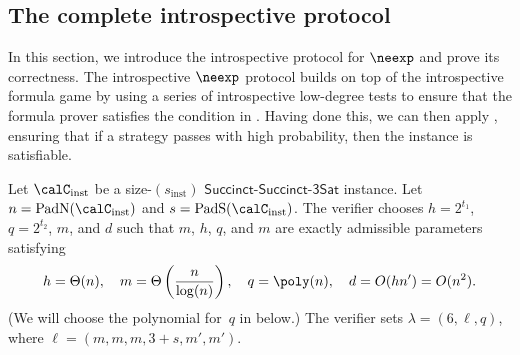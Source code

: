 \documentclass[11pt]{article}
\newcommand{\succinctsquared}{\mathsf{Succinct}\text{-}\mathsf{Succinct}\text{-}\mathsf{3Sat}}
\begin{document}
\subsection{The complete introspective protocol}\label{sec:the-whole-banana}

In this section, we introduce the introspective protocol for $\neexp$ and prove its correctness.
The introspective $\neexp$ protocol builds on top of the introspective formula game
by using a series of introspective low-degree tests to ensure that the formula prover satisfies the condition in .
Having done this, we can then apply ,
ensuring that if a strategy passes with high probability, then the instance is satisfiable.

\begin{definition}\label{def:the-protocol-to-end-all-protocols}
Let $\calC_{\mathrm{inst}}$ be a size-$(s_{\mathrm{inst}})$ $\succinctsquared$ instance.
Let $n = \mathrm{PadN}(\calC_{\mathrm{inst}})$ and $s = \mathrm{PadS}(\calC_{\mathrm{inst}})$.
The verifier chooses $h = 2^{t_1}$, $q = 2^{t_2}$, $m$, and $d$
such that $m$, $h$, $q$, and $m$ are exactly admissible parameters satisfying
\begin{equation*}
h = \Theta(n),
\quad
m = \Theta\left(\frac{n}{\log(n)}\right),
\quad
q = \poly(n),
\quad
d = O(hn') = O(n^2).
\end{equation*}
(We will choose the polynomial for~$q$ in  below.)
The verifier sets $\lambda = (6, \ell, q)$,
where $\ell = (m,m,m, 3 + s, m', m')$.


\end{definition}
\end{document}
